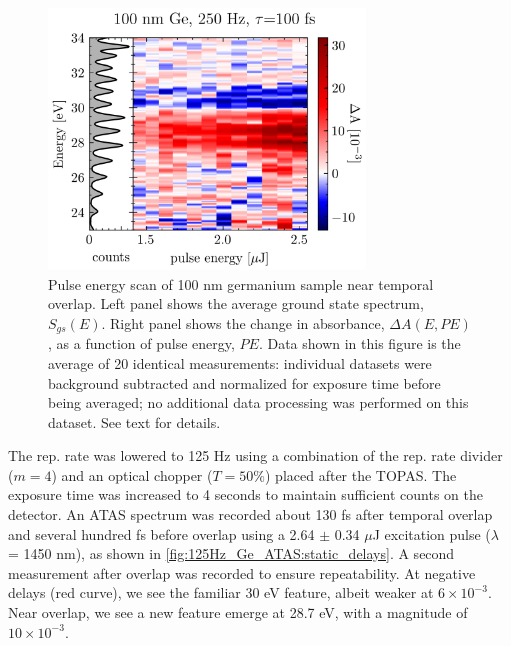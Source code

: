 \begin{figure}
	\centering
	\includegraphics[width=0.75\textwidth]{figures/chap3/Ge_power_scan_20190911.png}
	\caption{Pulse energy scan of 100 nm germanium sample near temporal overlap. Left panel shows the average ground state spectrum, $S_{gs}(E)$. Right panel shows the change in absorbance, $\Delta A(E, PE)$, as a function of pulse energy, $PE$. Data shown in this figure is the average of 20 identical measurements: individual datasets were background subtracted and normalized for exposure time before being averaged; no additional data processing was performed on this dataset. See text for details.}
	\label{fig:Ge_power_scan}
\end{figure}

The rep. rate was lowered to 125 Hz using a combination of the rep. rate divider ($m=4$) and an optical chopper ($T = 50\%$) placed after the TOPAS. The exposure time was increased to 4 seconds to maintain sufficient counts on the detector. An ATAS spectrum was recorded about 130 fs after temporal overlap and several hundred fs before overlap using a 2.64 $\pm$ 0.34 $\mu$J excitation pulse ($\lambda$ = 1450 nm), as shown in \cref{fig:125Hz_Ge_ATAS:static_delays}. A second measurement after overlap was recorded to ensure repeatability. At negative delays (red curve), we see the familiar 30 eV feature, albeit weaker at $6 \times 10^{-3}$. Near overlap, we see a new feature emerge at 28.7 eV, with a magnitude of $10 \times 10^{-3}$.

